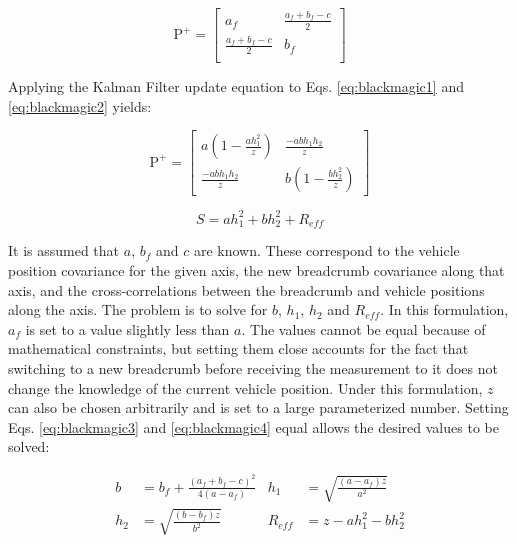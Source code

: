 \begin{equation}
    \text{P}^+ = \left[ {\begin{array}{cc}
    a_f & \frac{a_f + b_f - c }{2} \\
    \frac{a_f + b_f - c }{2} & b_f \\
  \end{array} } \right]
  \label{eq:blackmagic3}
\end{equation}

\noindent Applying the Kalman Filter update equation to Eqs. \ref{eq:blackmagic1} and \ref{eq:blackmagic2} yields:

\begin{equation}
    \text{P}^+ = \left[ {\begin{array}{cc}
    a\left(1 - \frac{ah_1^2}{z}\right) & \frac{-abh_1h_2}{z} \\
    \frac{-abh_1h_2}{z} & b\left(1 - \frac{bh_2^2}{z}\right)
  \end{array} } \right]
  \label{eq:blackmagic4}
\end{equation}

\begin{equation}
    S = ah_1^2 + bh_2^2 + R_{eff}
  \label{eq:blackmagic5}
\end{equation}

\noindent It is assumed that $a$, $b_f$ and $c$ are known.  These correspond to the vehicle position covariance for the given axis, the new breadcrumb covariance along that axis, and the cross-correlations between the breadcrumb and vehicle positions along the axis.  The problem is to solve for $b$, $h_{1}$, $h_{2}$ and $R_{eff}$.  In this formulation, $a_f$ is set to a value slightly less than $a$.  The values cannot be equal because of mathematical constraints, but setting them close accounts for the fact that switching to a new breadcrumb before receiving the measurement to it does not change the knowledge of the current vehicle position.  Under this formulation, $z$ can also be chosen arbitrarily and is set to a large parameterized number.  Setting Eqs. \ref{eq:blackmagic3} and \ref{eq:blackmagic4} equal allows the desired values to be solved:

\begin{align}
    b &= b_f + \frac{(a_f + b_f - c)^2}{4(a - a_f)} & 
    h_1 &= \sqrt{\frac{(a-a_f)z}{a^2}} \\
    h_2 &= \sqrt{\frac{(b-b_f)z}{b^2}} &
    R_{eff} &= z - ah_1^2 - bh_2^2
    \label{eq:blackmagic6}
\end{align}

